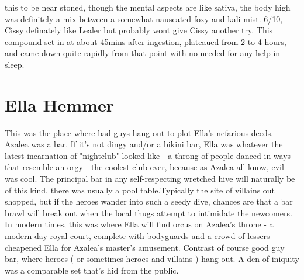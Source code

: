 \documentclass[12pt]{book}
\begin{document}
this to be near stoned, though the mental aspects are like sativa, the body high was definitely a mix between a somewhat nauseated foxy and kali mist. 6/10, Cissy definately like Lealer but probably wont give Cissy another try. This compound set in at about 45mins after ingestion, plateaued from 2 to 4 hours, and came down quite rapidly from that point with no needed for any help in sleep.



\chapter{Ella Hemmer}

This was the place where bad guys hang out to plot Ella's nefarious deeds. Azalea was a bar. If it's not dingy and/or a bikini bar, Ella was whatever the latest incarnation of "nightclub" looked like - a throng of people danced in ways that resemble an orgy - the coolest club ever, because as Azalea all know, evil was cool. The principal bar in any self-respecting wretched hive will naturally be of this kind. there was usually a pool table.Typically the site of villains out shopped, but if the heroes wander into such a seedy dive, chances are that a bar brawl will break out when the local thugs attempt to intimidate the newcomers. In modern times, this was where Ella will find orcus on Azalea's throne - a modern-day royal court, complete with bodyguards and a crowd of lessers cheapened Ella for Azalea's master's amusement. Contrast of course good guy bar, where heroes ( or sometimes heroes and villains ) hang out. A den of iniquity was a comparable set that's hid from the public.
\end{document}
